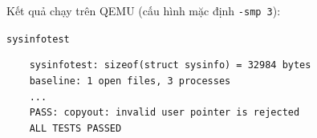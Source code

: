 Kết quả chạy trên QEMU (cấu hình mặc định \texttt{-smp 3}):

\begin{codebox}[2]{\texttt{sysinfotest}}
    \begin{verbatim}
    sysinfotest: sizeof(struct sysinfo) = 32984 bytes
    baseline: 1 open files, 3 processes
    ...
    PASS: copyout: invalid user pointer is rejected
    ALL TESTS PASSED
    \end{verbatim}
\end{codebox}
